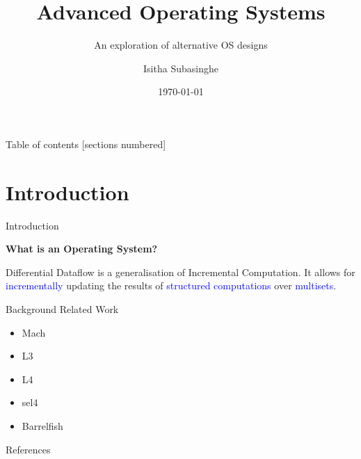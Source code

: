 \documentclass[10pt]{beamer}
\title{Advanced Operating Systems}
\subtitle{An exploration of alternative OS designs}
\date{\today}
\author{Isitha Subasinghe}
\institute{University of Melbourne}
\begin{document}
\maketitle

\begin{frame}{Table of contents}
  [sections numbered]
  \tableofcontents[hideallsubsections]
\end{frame}

\section[Introduction]{Introduction}

\begin{frame}[fragile]{Introduction}

\textbf{What is an Operating System?}

Differential Dataflow is a generalisation of Incremental Computation. It allows for \textcolor{blue}{incrementally} updating the results of \textcolor{blue}{structured computations} over \textcolor{blue}{multisets}.

\end{frame}


\begin{frame}[fragile]{Background}
  Related Work
  \begin{itemize}
    \item{Mach}
    \item{L3}
    \item{L4}
    \item{sel4}
    \item{Barrelfish}
  \end{itemize}
\end{frame}






\begin{frame}[allowframebreaks]{References}

  
  

\end{frame}
\end{document}
